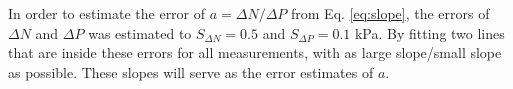 


In order to estimate the error of $a =\Delta N/ \Delta P$ from Eq. \ref{eq:slope}, the errors of $\Delta N$ and $\Delta P$ was estimated to $S_{\Delta N}=0.5$ and $S_{\Delta P}=0.1$ kPa. By fitting two lines that are inside these errors for all measurements, with as large slope/small slope as possible. These slopes will serve as the error estimates of $a$.
